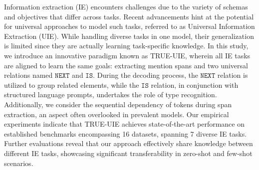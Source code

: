 Information extraction (IE) encounters challenges due to the variety of schemas and objectives that differ across tasks. Recent advancements hint at the potential for universal approaches to model such tasks, referred to as Universal Information Extraction (UIE). While handling diverse tasks in one model, their generalization is limited since they are actually learning task-specific knowledge. In this study, we introduce an innovative paradigm known as TRUE-UIE, wherein all IE tasks are aligned to learn the same goals: extracting mention spans and two universal relations named $\mathtt{NEXT}$ and $\mathtt{IS}$.  During the decoding process, the $\mathtt{NEXT}$ relation is utilized to group related elements, while the $\mathtt{IS}$ relation, in conjunction with structured language prompts, undertakes the role of type recognition.  Additionally, we consider the sequential dependency of tokens during span extraction, an aspect often overlooked in prevalent models. Our empirical experiments indicate that TRUE-UIE achieves state-of-the-art performance on established benchmarks encompassing 16 datasets, spanning 7 diverse IE tasks.  Further evaluations reveal that our approach effectively share knowledge between different IE tasks, showcasing significant transferability in zero-shot and few-shot scenarios.